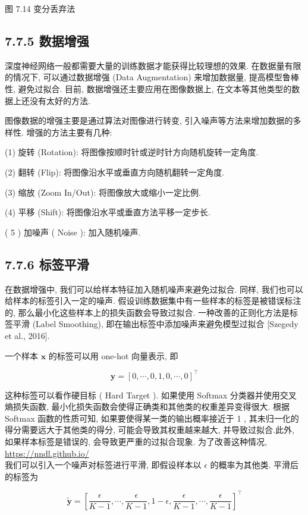 \documentclass[10pt]{article}
\begin{document}
图 7.14 变分丢弃法

\subsection*{7.7.5 数据增强}
深度神经网络一般都需要大量的训练数据才能获得比较理想的效果. 在数据量有限的情况下, 可以通过数据增强 (Data Augmentation) 来增加数据量, 提高模型鲁棒性, 避免过拟合. 目前, 数据增强还主要应用在图像数据上, 在文本等其他类型的数据上还没有太好的方法.

图像数据的增强主要是通过算法对图像进行转变, 引入噪声等方法来增加数据的多样性. 增强的方法主要有几种:

(1) 旋转 (Rotation): 将图像按顺时针或逆时针方向随机旋转一定角度.

(2) 翻转 (Flip): 将图像沿水平或垂直方向随机翻转一定角度.

(3) 缩放 (Zoom In/Out): 将图像放大或缩小一定比例.

(4) 平移 (Shift): 将图像沿水平或垂直方法平移一定步长.

( 5 ) 加噪声 ( Noise ): 加入随机噪声.

\subsection*{7.7.6 标签平滑}
在数据增强中, 我们可以给样本特征加入随机噪声来避免过拟合. 同样, 我们也可以给样本的标签引入一定的噪声. 假设训练数据集中有一些样本的标签是被错误标注的, 那么最小化这些样本上的损失函数会导致过拟合. 一种改善的正则化方法是标签平滑 (Label Smoothing), 即在输出标签中添加噪声来避免模型过拟合 [Szegedy et al., 2016].

一个样本 $\boldsymbol{x}$ 的标签可以用 one-hot 向量表示, 即

$$
\boldsymbol{y}=[0, \cdots, 0,1,0, \cdots, 0]^{\top}
$$

这种标签可以看作硬目标 ( Hard Target ). 如果使用 Softmax 分类器并使用交叉熵损失函数, 最小化损失函数会使得正确类和其他类的权重差异变得很大. 根据 Softmax 函数的性质可知, 如果要使得某一类的输出概率接近于 1 , 其未归一化的得分需要远大于其他类的得分, 可能会导致其权重越来越大, 并导致过拟合.此外, 如果样本标签是错误的, 会导致更严重的过拟合现象. 为了改善这种情况, \href{https://nndl.github.io/}{https://nndl.github.io/}\\
我们可以引入一个噪声对标签进行平滑, 即假设样本以 $\epsilon$ 的概率为其他类. 平滑后的标签为

$$
\tilde{\boldsymbol{y}}=\left[\frac{\epsilon}{K-1}, \cdots, \frac{\epsilon}{K-1}, 1-\epsilon, \frac{\epsilon}{K-1}, \cdots, \frac{\epsilon}{K-1}\right]^{\top}
$$
\end{document}
